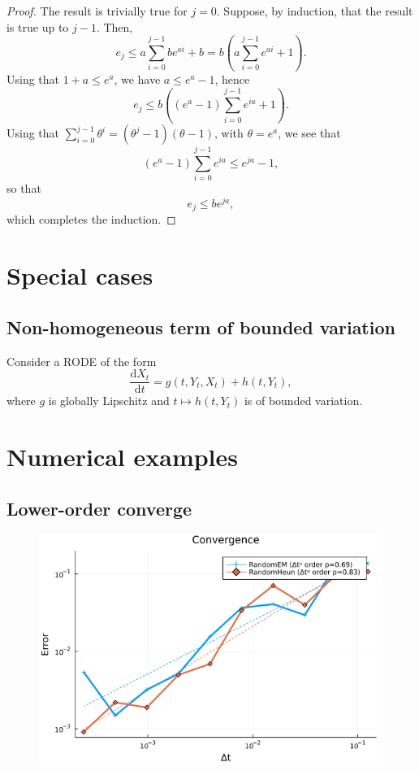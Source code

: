 \documentclass[reqno,12pt]{amsart}
\theoremstyle{plain}%
\theoremstyle{definition}
\begin{document}
\begin{proof}
  The result is trivially true for $j=0$. Suppose, by induction, that the result is true up to $j-1$. Then,
  $$
  e_j \leq a \sum_{i=0}^{j-1} be^{ai} + b = b \left(a \sum_{i=0}^{j-1} e^{ai} + 1\right).
  $$
  Using that $1 + a \leq e^a$, we have $a \leq e^a - 1$, hence
  $$
  e_j \leq b\left((e^a - 1)\sum_{i=0}^{j-1} e^{ia} + 1\right).
  $$
  Using that $\sum_{i=0}^{j-1} \theta^i = (\theta^j - 1)(\theta - 1)$, with $\theta = e^a$, we see that
  $$
  (e^a - 1)\sum_{i=0}^{j-1} e^{ia} \leq e^{ja} - 1,
  $$
  so that
  $$
  e_j \leq be^{ja},
  $$
  which completes the induction.
\end{proof}

\section{Special cases}

\subsection{Non-homogeneous term of bounded variation}

Consider a RODE of the form
\[
\frac{\mathrm{d}X_t}{\mathrm{d}t} = g(t, Y_t, X_t) + h(t, Y_t),    
\]
where $g$ is globally Lipschitz and $t \mapsto h(t, Y_t)$ is of bounded variation.

\section{Numerical examples}

\subsection{Lower-order converge}

\begin{figure}
  \includegraphics{img/plot_13.png}
\end{figure}
\end{document}
